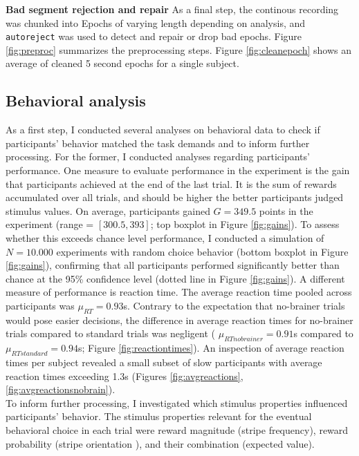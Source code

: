 \textbf{Bad segment rejection and repair} As a final step, the continous recording was chunked into Epochs of varying length depending on analysis, and \texttt{autoreject} was used to detect and repair or drop bad epochs.
Figure \ref{fig:preproc} summarizes the preprocessing steps.
Figure \ref{fig:cleanepoch} shows an average of cleaned 5 second epochs for a single subject.




\subsection{Behavioral analysis}

As a first step, I conducted several analyses on behavioral data to check if participants' behavior matched the task demands and to inform further processing.
For the former, I conducted analyses regarding participants' performance.
One measure to evaluate performance in the experiment is the gain that participants achieved at the end of the last trial.
It is the sum of rewards accumulated over all trials, and should be higher the better participants judged stimulus values.
On average, participants gained $G=349.5$ points in the experiment (range = $[300.5, 393]$; top boxplot in Figure \ref{fig:gains}).
To assess whether this exceeds chance level performance, I conducted a simulation of $N=10.000$ experiments with random choice behavior (bottom boxplot in Figure \ref{fig:gains}), confirming that all participants performed significantly better than chance at the 95\% confidence level (dotted line in Figure \ref{fig:gains}).
A different measure of performance is reaction time.
The average reaction time pooled across participants was $\mu_{RT}=0.93$s.
Contrary to the expectation that no-brainer trials would pose easier decisions, the difference in average reaction times for no-brainer trials compared to standard trials was negligent ( $\mu_{RTnobrainer}=0.91$s compared to  $\mu_{RTstandard}=0.94$s; Figure \ref{fig:reactiontimes}).
An inspection of average reaction times per subject revealed a small subset of slow participants with average reaction times exceeding 1.3s (Figures \ref{fig:avgreactions}, \ref{fig:avgreactionsnobrain}).\\
To inform further processing, I investigated which stimulus properties influenced participants' behavior.
The stimulus properties relevant for the eventual behavioral choice in each trial were reward magnitude (stripe frequency), reward probability (stripe orientation ), and their combination (expected value).
